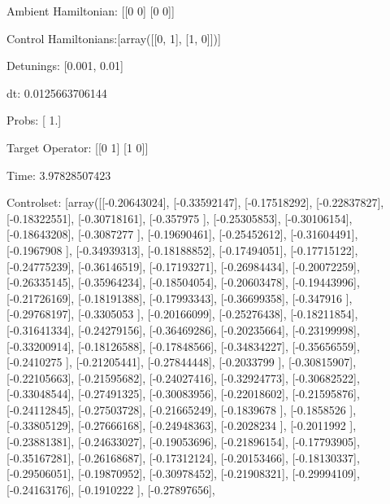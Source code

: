 \documentclass{article}
\begin{document}
    

\newpage

Ambient Hamiltonian: [[0 0]
 [0 0]]

Control Hamiltonians:[array([[0, 1],
       [1, 0]])]

Detunings: [0.001, 0.01]

 dt: 0.0125663706144

Probs: [ 1.]

Target Operator: [[0 1]
 [1 0]]

Time: 3.97828507423

Controlset: [array([[-0.20643024],
       [-0.33592147],
       [-0.17518292],
       [-0.22837827],
       [-0.18322551],
       [-0.30718161],
       [-0.357975  ],
       [-0.25305853],
       [-0.30106154],
       [-0.18643208],
       [-0.3087277 ],
       [-0.19690461],
       [-0.25452612],
       [-0.31604491],
       [-0.1967908 ],
       [-0.34939313],
       [-0.18188852],
       [-0.17494051],
       [-0.17715122],
       [-0.24775239],
       [-0.36146519],
       [-0.17193271],
       [-0.26984434],
       [-0.20072259],
       [-0.26335145],
       [-0.35964234],
       [-0.18504054],
       [-0.20603478],
       [-0.19443996],
       [-0.21726169],
       [-0.18191388],
       [-0.17993343],
       [-0.36699358],
       [-0.347916  ],
       [-0.29768197],
       [-0.3305053 ],
       [-0.20166099],
       [-0.25276438],
       [-0.18211854],
       [-0.31641334],
       [-0.24279156],
       [-0.36469286],
       [-0.20235664],
       [-0.23199998],
       [-0.33200914],
       [-0.18126588],
       [-0.17848566],
       [-0.34834227],
       [-0.35656559],
       [-0.2410275 ],
       [-0.21205441],
       [-0.27844448],
       [-0.2033799 ],
       [-0.30815907],
       [-0.22105663],
       [-0.21595682],
       [-0.24027416],
       [-0.32924773],
       [-0.30682522],
       [-0.33048544],
       [-0.27491325],
       [-0.30083956],
       [-0.22018602],
       [-0.21595876],
       [-0.24112845],
       [-0.27503728],
       [-0.21665249],
       [-0.1839678 ],
       [-0.1858526 ],
       [-0.33805129],
       [-0.27666168],
       [-0.24948363],
       [-0.2028234 ],
       [-0.2011992 ],
       [-0.23881381],
       [-0.24633027],
       [-0.19053696],
       [-0.21896154],
       [-0.17793905],
       [-0.35167281],
       [-0.26168687],
       [-0.17312124],
       [-0.20153466],
       [-0.18130337],
       [-0.29506051],
       [-0.19870952],
       [-0.30978452],
       [-0.21908321],
       [-0.29994109],
       [-0.24163176],
       [-0.1910222 ],
       [-0.27897656],
\end{document}
